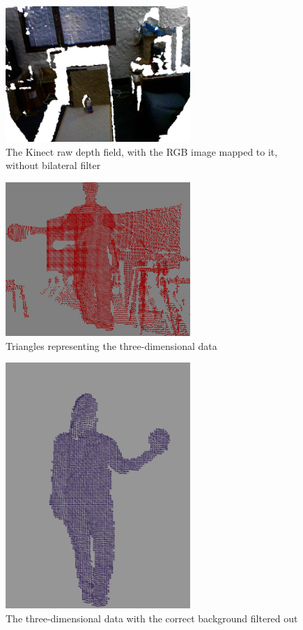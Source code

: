 \documentclass[pdftex,10.5pt]{report}
\begin{document}
\begin{figure}[H]
	\centering
	\includegraphics[width=70mm]{figures/kinectwaterbottle.png}
	\caption{The Kinect raw depth field, with the RGB image mapped to it, without bilateral filter}
	\label{waterbot}
\end{figure}

\begin{figure}[H]
	\centering
	\includegraphics[width=70mm]{figures/3dtriangles.png}
	\caption{Triangles representing the three-dimensional data}
	\label{3dtri}
\end{figure}

\begin{figure}[H]
	\centering
	\includegraphics[width=70mm]{figures/cadyholdingball.png}
	\caption{The three-dimensional data with the correct background filtered out}
	\label{balls2}
\end{figure}
\end{document}

